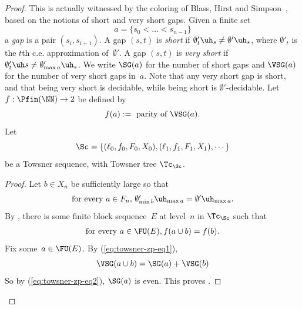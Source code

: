 \documentclass{article}
\numberwithin{theorem}{section}
\newtheorem{proposition}[theorem]{Proposition}
\newtheorem{claim}{Claim}
\begin{document}
\begin{proof}
This is actually witnessed by the coloring of Blass, Hirst and Simpson~\cite{blassLogicalAnalysisTheorems1987}, based on the notions of short and very short gaps. 
Given a finite set 
$$a  = \{ s_0 < \dots < s_{n-1} \}$$
a \emph{gap} is a pair $(s_i, s_{i+1})$.
A gap $(s, t)$ is \emph{short} if $\emptyset'_t \uh_s \neq \emptyset' \uh_s$, where $\emptyset'_t$ is the $t$th c.e. approximation of~$\emptyset'$. A gap $(s, t)$ is \emph{very short} if $\emptyset'_t \uh s \neq \emptyset'_{\max a} \uh_s$. We write $\SG(a)$ for the number of short gaps and $\VSG(a)$ for the number of very short gaps in~$a$. 
Note that any very short gap is short, and that being very short is decidable, while being short is $\emptyset'$-decidable. Let $f : \Pfin(\NN) \to 2$ be defined by 
$$f(a) := \text{ parity of } \VSG(a).$$
Let
$$\Sc = \{ (\ell_0, f_0, F_0, X_0), (\ell_1, f_1, F_1, X_1), \cdots \}$$
be a Towsner sequence, with Towsner tree $\Tc_{\Sc}$.


\begin{proof}
Let $b \in X_n$ be sufficiently large so that 
\begin{align}\label{eq:towsner-zp-eq1}
    \text{for every $a \in F_n$, }  \emptyset'_{\min b} \uh_{\max a} = \emptyset' \uh_{\max a}.
\end{align}
By , there is some finite block sequence~$E$ at level~$n$ in $\Tc_{\Sc}$ such that
\begin{align}\label{eq:towsner-zp-eq2}
    \text{for every } a \in \FU(E), f(a \cup b) = f(b).
\end{align}
Fix some~$a \in \FU(E)$. By (\ref{eq:towsner-zp-eq1}),
$$
\VSG(a \cup b) = \SG(a) + \VSG(b)
$$
So by (\ref{eq:towsner-zp-eq2}), $\SG(a)$ is even. This proves .
\end{proof}


\end{proof}
\end{document}
